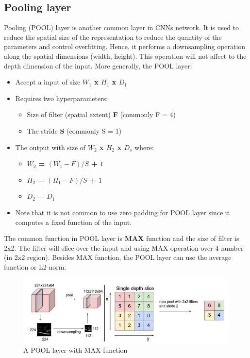 \subsection{Pooling layer}
Pooling (POOL) layer  is another common layer in CNNs network. It is used to reduce the spatial size of the representation to reduce the quantity of the parameters and control overfitting. Hence, it performs a downsampling operation along the spatial dimensions (width, height). This operation will not affect to the depth dimension of the input. More generally, the POOL layer:
\begin{itemize}
	\item Accept a input of size \textbf{$W_1$ x $H_1$ x $D_1$}
	\item Requires two hyperparameters:
		\begin{itemize}
			\item Size of filter (spatial extent) \textbf{F} (commonly F = 4)
			\item The stride \textbf{S} (commonly S = 1)
		\end{itemize}
	\item The output with size of \textbf{$W_2$ x $H_2$ x $D_s$} where:
		\begin{itemize}
			\item \textbf{$W_2$ = $(W_1 - F)/S$ + $1$}
			\item \textbf{$H_2$ = $(H_1 - F)/S$ + $1$}
			\item \textbf{$D_2$ = $D_1$}
		\end{itemize}
	\item Note that it is not common to use zero padding for POOL layer since it computes a fixed function of the input.
\end{itemize}
The common function in POOL layer is \textbf{MAX} function and the size of filter is 2x2. The filter will slice over the input and using MAX operation over 4 number (in 2x2 region). Besides MAX function, the POOL layer can use the average function or L2-norm.
\begin{figure}[!h]
	\centering
	\includegraphics[scale=0.65]{images/pooling}
	\caption{A POOL layer with MAX function}
	\label{figconvw1}
\end{figure}

